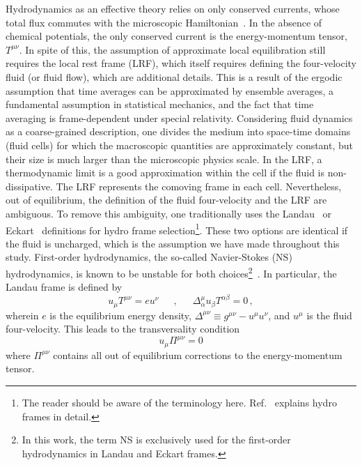 \documentclass[12pt,onecolumn,showpacs,amssymb,aps,nofootinbib,floatfix]{revtex4-2}
\newcommand{\eqcomma}{\phantom{AA},\phantom{AA}}
\begin{document}
	Hydrodynamics as an effective theory relies on only conserved currents, whose total flux commutes with the microscopic Hamiltonian~\cite{nicolis,nicolis2,beta,jackiw,glorioso,grozdanov,ryblewski,montenegro}. In the absence of chemical potentials, the only conserved current is the energy-momentum tensor, $T^{\mu\nu}$. In spite of this, the assumption of approximate local equilibration still requires the local rest frame (LRF), which itself requires defining the four-velocity fluid (or fluid flow), which are additional details. This is a result of the ergodic assumption that time averages can be approximated by ensemble averages, a fundamental assumption in statistical mechanics, and the fact that time averaging is frame-dependent under special relativity.  
	Considering fluid dynamics as a coarse-grained description, one divides the medium into space-time domains (fluid cells) for which the macroscopic quantities are approximately constant, but their size is much larger than the microscopic physics scale. In the LRF, a thermodynamic limit is a good approximation within the cell if the fluid is non-dissipative. The LRF represents the comoving frame in each cell. Nevertheless, out of equilibrium, the definition of the fluid four-velocity and the LRF are ambiguous. To remove this ambiguity, one traditionally uses the Landau~\cite{landau} or Eckart~\cite{Eckart} definitions for hydro frame selection\footnote{The reader should be aware of the terminology here. Ref.~\cite{kovfluct} explains hydro frames in detail.}. These two options are identical if the fluid is uncharged, which is the assumption we have made throughout this study. First-order hydrodynamics, the so-called Navier-Stokes (NS) hydrodynamics, is known to be unstable for both choices\footnote{In this work, the term NS is exclusively used for the first-order hydrodynamics in Landau and Eckart frames.}~\cite{hislim,sc-problem-85,sc-problem-87}. In particular, the Landau frame is defined by
	\begin{equation}\label{eq:landau}
		u_\mu T^{\mu \nu}=eu^\nu\eqcomma \Delta^{\mu}_{\alpha}u_\beta T^{\alpha\beta} = 0\,,
	\end{equation}
	wherein $e$ is the equilibrium energy density, $\Delta^{\mu\nu}\equiv g^{\mu\nu} - u^\mu u^\nu$, and $u^\mu$ is the fluid four-velocity. This leads to the transversality condition
	\begin{equation}
          \label{trans}
		u_\mu \Pi^{\mu\nu} = 0
	\end{equation}
	where $\Pi^{\mu\nu}$ contains all out of equilibrium corrections to the energy-momentum tensor.
\end{document}

